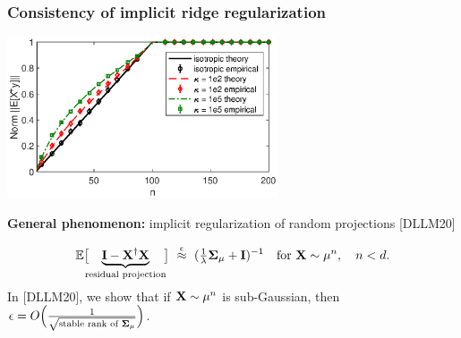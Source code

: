 \documentclass[8pt]{beamer}
\begin{document}
\begin{frame}
  \frametitle{Consistency of implicit ridge regularization}
  \begin{center}
    \includegraphics[width=0.6\textwidth]{figs/descent-shrinkage}
  \end{center}

\textbf{General phenomenon:} implicit regularization of random projections [DLLM20]
 
\begin{align*}
\mathbb E\big[ \!\!\! \underbrace{\mathbf I-\mathbf X^\dagger\mathbf X}_{\text{residual projection}}\!\!\big]\
\overset\epsilon\approx\ (\tfrac1{\lambda}\mathbf{\Sigma}_{\mu}+\mathbf I)^{-1}
  \quad\text{for }\mathbf X\sim\mu^n,\quad n<d.
\end{align*}
In [DLLM20], we show that if $\mathbf X\sim\mu^n$ is sub-Gaussian, then $\epsilon = O\Big(\frac1{\sqrt{\text{stable rank of }\mathbf{\Sigma}_{\mu}}}\Big)$.
  

\let\thefootnote\relax{}

  
\end{frame}
\end{document}
